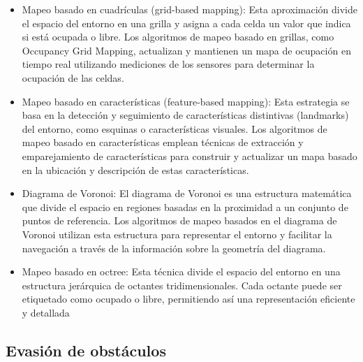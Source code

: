 \documentclass[sigconf]{acmart}
\begin{document}
\begin{itemize}

\item Mapeo basado en cuadrículas (grid-based mapping): Esta aproximación divide el espacio del entorno en una grilla y asigna a cada celda un valor que indica si está ocupada o libre. Los algoritmos de mapeo basado en grillas, como Occupancy Grid Mapping, actualizan y mantienen un mapa de ocupación en tiempo real utilizando mediciones de los sensores para determinar la ocupación de las celdas.

\item Mapeo basado en características (feature-based mapping): Esta estrategia se basa en la detección y seguimiento de características distintivas (landmarks) del entorno, como esquinas o características visuales. Los algoritmos de mapeo basado en características emplean técnicas de extracción y emparejamiento de características para construir y actualizar un mapa basado en la ubicación y descripción de estas características.

\item Diagrama de Voronoi: El diagrama de Voronoi es una estructura matemática que divide el espacio en regiones basadas en la proximidad a un conjunto de puntos de referencia. Los algoritmos de mapeo basados en el diagrama de Voronoi utilizan esta estructura para representar el entorno y facilitar la navegación a través de la información sobre la geometría del diagrama.

\item Mapeo basado en octree: Esta técnica divide el espacio del entorno en una estructura jerárquica de octantes tridimensionales. Cada octante puede ser etiquetado como ocupado o libre, permitiendo así una representación eficiente y detallada
\end{itemize}

\subsection*{Evasión de obstáculos}
\end{document}
